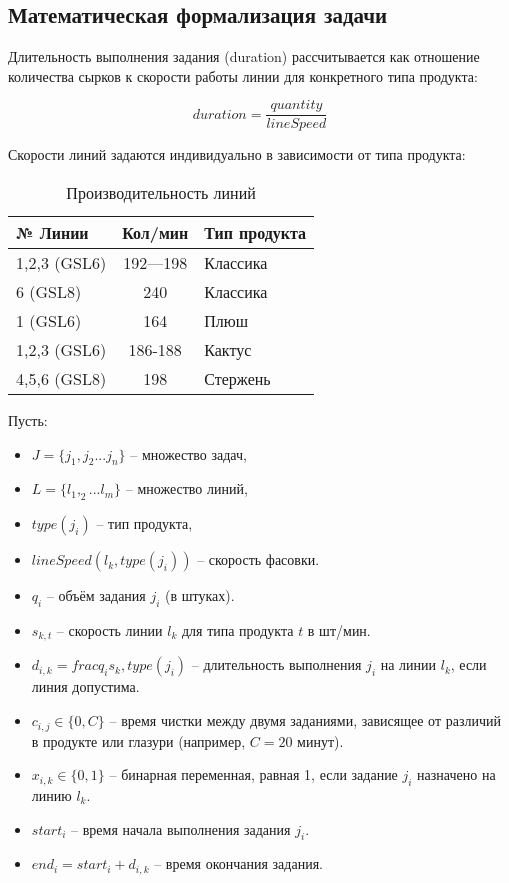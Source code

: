 \subsection{Математическая формализация задачи}

Длительность выполнения задания (duration) рассчитывается как отношение количества сырков к скорости работы линии для конкретного типа продукта:

\begin{equation}
    duration = \frac{quantity}{lineSpeed}
\end{equation}

Скорости линий задаются индивидуально в зависимости от типа продукта:

\begin{table}[h]
\centering
\caption{Производительность линий}
\begin{tabularx}{\textwidth}{|l|c|X|}
\hline
\textbf{№ Линии} & \textbf{ Кол/мин} & \textbf{Тип продукта} \\
\hline
1,2,3 (GSL6) & 192—198 & Классика \\
\hline
6 (GSL8)     & 240     & Классика \\
\hline
1 (GSL6)     & 164     & Плюш \\
\hline
1,2,3 (GSL6) & 186-188 & Кактус \\
\hline
4,5,6 (GSL8) & 198     & Стержень \\
\hline
\end{tabularx}
\end{table}

Пусть:
\begin{itemize}
    \item $J =\{j_1, j_2...j_n\}$ -- множество задач,
    \item $ L = \{l_1, _2...l_m\}$ -- множество линий,
    \item $type(j_i)$ -- тип продукта,
    \item $lineSpeed(l_k,type(j_i))$ -- скорость фасовки.
    \item $q_i$ -- объём задания $j_i$ (в штуках).
    \item $s_{k,t}$ -- скорость линии $l_k$ для типа продукта $t$ в шт/мин.
    \item $d_{i,k} = frac{q_i}{s_k, type(j_i)}$ -- длительность выполнения $j_i$ на линии $l_k$, если линия допустима.
    \item $c_{i,j} \in \{0, C\}$ -- время чистки между двумя заданиями, зависящее от различий в продукте или глазури (например, $C = 20$ минут).
    \item $x_{i,k} \in \{0, 1\}$ -- бинарная переменная, равная 1, если задание $j_i$ назначено на линию $l_k$.
    \item $start_i$ -- время начала выполнения задания $j_i$.
    \item $end_i = start_i+ d_{i,k}$ -- время окончания задания.
\end{itemize}

